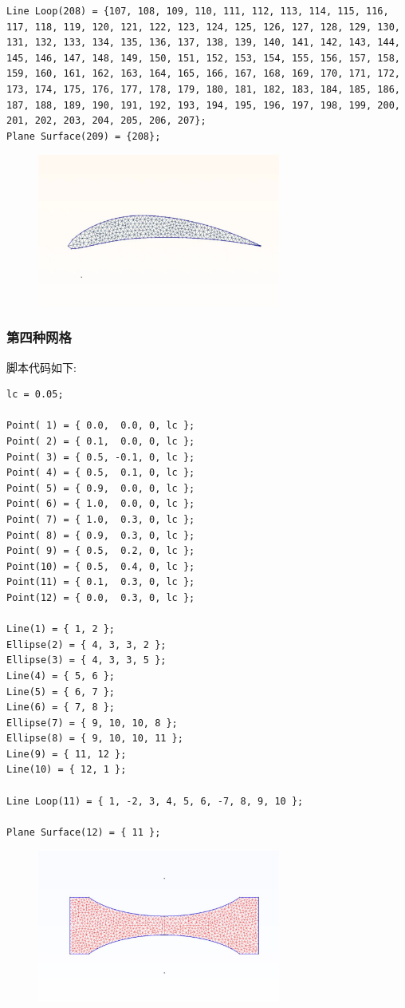 \documentclass[12pt]{article}
\begin{document}
\begin{CJK}{UTF8}{gkai}
\begin{verbatim}
Line Loop(208) = {107, 108, 109, 110, 111, 112, 113, 114, 115, 116, 117, 118, 119, 120, 121, 122, 123, 124, 125, 126, 127, 128, 129, 130, 131, 132, 133, 134, 135, 136, 137, 138, 139, 140, 141, 142, 143, 144, 145, 146, 147, 148, 149, 150, 151, 152, 153, 154, 155, 156, 157, 158, 159, 160, 161, 162, 163, 164, 165, 166, 167, 168, 169, 170, 171, 172, 173, 174, 175, 176, 177, 178, 179, 180, 181, 182, 183, 184, 185, 186, 187, 188, 189, 190, 191, 192, 193, 194, 195, 196, 197, 198, 199, 200, 201, 202, 203, 204, 205, 206, 207};
Plane Surface(209) = {208};
\end{verbatim}
\begin{figure}[H]
	\centering
	\includegraphics[width=8cm]{air.png}
	\caption{}  		
\end{figure}
\subsubsection{第四种网格}
脚本代码如下:\\
\begin{verbatim}
lc = 0.05;

Point( 1) = { 0.0,  0.0, 0, lc };
Point( 2) = { 0.1,  0.0, 0, lc };
Point( 3) = { 0.5, -0.1, 0, lc };
Point( 4) = { 0.5,  0.1, 0, lc };
Point( 5) = { 0.9,  0.0, 0, lc };
Point( 6) = { 1.0,  0.0, 0, lc };
Point( 7) = { 1.0,  0.3, 0, lc };
Point( 8) = { 0.9,  0.3, 0, lc };
Point( 9) = { 0.5,  0.2, 0, lc };
Point(10) = { 0.5,  0.4, 0, lc };
Point(11) = { 0.1,  0.3, 0, lc };
Point(12) = { 0.0,  0.3, 0, lc };

Line(1) = { 1, 2 };
Ellipse(2) = { 4, 3, 3, 2 };
Ellipse(3) = { 4, 3, 3, 5 };
Line(4) = { 5, 6 };
Line(5) = { 6, 7 };
Line(6) = { 7, 8 };
Ellipse(7) = { 9, 10, 10, 8 };
Ellipse(8) = { 9, 10, 10, 11 };
Line(9) = { 11, 12 };
Line(10) = { 12, 1 };

Line Loop(11) = { 1, -2, 3, 4, 5, 6, -7, 8, 9, 10 };

Plane Surface(12) = { 11 };
\end{verbatim}
\begin{figure}[H]
	\centering
	\includegraphics[width=8cm]{ao.png}
	\caption{}  		
\end{figure}

\end{CJK}
\end{document}
